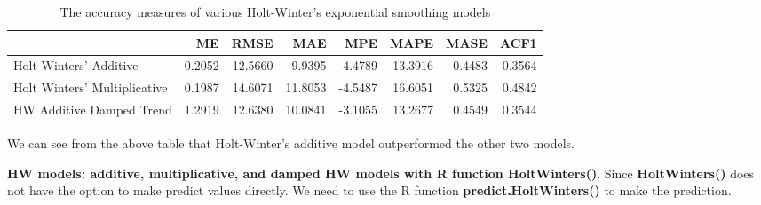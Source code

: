 \documentclass[
]{book}
\begin{document}
\begin{table}

\caption{\label{tab:unnamed-chunk-232}The accuracy measures of various Holt-Winter's 
        exponential smoothing models}
\centering
\begin{tabular}[t]{l|r|r|r|r|r|r|r}
\hline
  & ME & RMSE & MAE & MPE & MAPE & MASE & ACF1\\
\hline
Holt Winters' Additive & 0.2052 & 12.5660 & 9.9395 & -4.4789 & 13.3916 & 0.4483 & 0.3564\\
\hline
Holt Winters' Multiplicative & 0.1987 & 14.6071 & 11.8053 & -4.5487 & 16.6051 & 0.5325 & 0.4842\\
\hline
HW Additive Damped Trend & 1.2919 & 12.6380 & 10.0841 & -3.1055 & 13.2677 & 0.4549 & 0.3544\\
\hline
\end{tabular}
\end{table}

We can see from the above table that Holt-Winter's additive model outperformed the other two models.

\textbf{HW models: additive, multiplicative, and damped HW models with R function HoltWinters()}. Since \textbf{HoltWinters()} does not have the option to make predict values directly. We need to use the R function \textbf{predict.HoltWinters()} to make the prediction.
\end{document}
